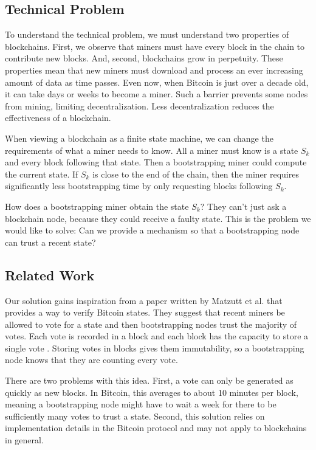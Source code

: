 

\subsection{Technical Problem}

To understand the technical problem, we must understand two properties of blockchains.
First, we observe that miners must have every block in the chain to contribute new blocks.
And, second, blockchains grow in perpetuity.
These properties mean that new miners must download and process an ever increasing amount of data as time passes.
Even now, when Bitcoin is just over a decade old, it can take days or weeks to become a miner.
Such a barrier prevents some nodes from mining, limiting decentralization.
Less decentralization reduces the effectiveness of a blockchain.

When viewing a blockchain as a finite state machine, we can change the requirements of what a miner needs to know.
All a miner must know is a state $S_k$ and every block following that state.
Then a bootstrapping miner could compute the current state.
If $S_k$ is close to the end of the chain, then the miner requires significantly less bootstrapping time by only requesting blocks following $S_k$.

How does a bootstrapping miner obtain the state $S_k$?
They can't just ask a blockchain node, because they could receive a faulty state.
This is the problem we would like to solve: Can we provide a mechanism so that a bootstrapping node can trust a recent state?

\subsection{Related Work}






Our solution gains inspiration from a paper written by Matzutt et al. that provides a way to verify Bitcoin states.
They suggest that recent miners be allowed to vote for a state and then bootstrapping nodes trust the majority of votes.
Each vote is recorded in a block and each block has the capacity to store a single vote \cite{matzutt2020HowTSPrune}.
Storing votes in blocks gives them immutability, so a bootstrapping node knows that they are counting every vote.

There are two problems with this idea.
First, a vote can only be generated as quickly as new blocks.
In Bitcoin, this averages to about 10 minutes per block, meaning a bootstrapping node might have to wait a week for there to be sufficiently many votes to trust a state.
Second, this solution relies on implementation details in the Bitcoin protocol and may not apply to blockchains in general.
